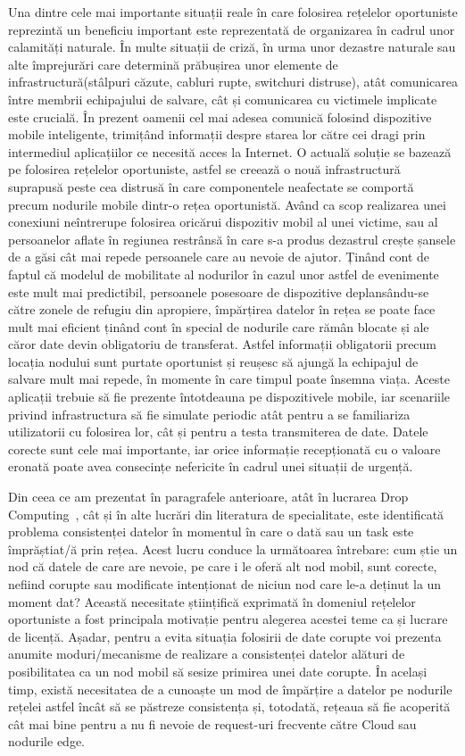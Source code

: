\documentclass[12pt,a4paper]{report}
\begin{document}
Una dintre cele mai importante situații reale în care folosirea rețelelor oportuniste reprezintă un beneficiu important este reprezentată de organizarea în cadrul unor calamități naturale. În multe situații de criză, în urma unor dezastre naturale sau alte împrejurări care determină prăbușirea unor elemente de infrastructură(stâlpuri căzute, cabluri rupte, switchuri distruse), atât comunicarea între membrii echipajului de salvare, cât și comunicarea cu victimele implicate este crucială. În prezent oamenii cel mai adesea comunică folosind dispozitive mobile inteligente, trimițând informații despre starea lor către cei dragi prin intermediul aplicațiilor ce necesită acces la Internet. O actuală soluție se bazează pe folosirea rețelelor oportuniste, astfel se creează o nouă infrastructură suprapusă peste cea distrusă în care componentele neafectate se comportă precum nodurile mobile dintr-o rețea oportunistă. Având ca scop realizarea unei conexiuni neîntrerupe folosirea oricărui dispozitiv mobil al unei victime, sau al persoanelor aflate în regiunea restrânsă în care s-a produs dezastrul crește șansele de a găsi cât mai repede persoanele care au nevoie de ajutor. Ținând cont de faptul că modelul de mobilitate al nodurilor în cazul unor astfel de evenimente este mult mai predictibil, persoanele posesoare de dispozitive deplansându-se către zonele de refugiu din apropiere, împărțirea datelor în rețea se poate face mult mai eficient ținând cont în special de nodurile care rămân blocate și ale căror date devin obligatoriu de transferat. Astfel informații obligatorii precum locația nodului sunt purtate oportunist și reușesc să ajungă la echipajul de salvare mult mai repede, în momente în care timpul poate însemna viața. Aceste aplicații trebuie să fie prezente întotdeauna pe dispozitivele mobile, iar scenariile privind infrastructura să fie simulate periodic atât pentru a se familiariza utilizatorii cu folosirea lor, cât și pentru a testa transmiterea de date. Datele corecte sunt cele mai importante, iar orice informație recepționată cu o valoare eronată poate avea consecințe nefericite în cadrul unei situații de urgență.

Din ceea ce am prezentat în paragrafele anterioare, atât în lucrarea Drop Computing~\cite{DC}, cât și în alte lucrări din literatura de specialitate, este identificată problema consistenței datelor în momentul în care o dată sau un task este împrăștiat/ă prin rețea. Acest lucru conduce la următoarea întrebare: cum știe un nod că datele de care are nevoie, pe care i le oferă alt nod mobil, sunt corecte, nefiind corupte sau modificate intenționat de niciun nod care le-a deținut la un moment dat? Această necesitate științifică exprimată în domeniul rețelelor oportuniste a fost principala motivație pentru alegerea acestei teme ca și lucrare de licență. Așadar, pentru a evita situația folosirii de date corupte voi prezenta anumite moduri/mecanisme de realizare a consistenței datelor alături de posibilitatea ca un nod mobil să sesize primirea unei date corupte. În același timp, există necesitatea de a cunoaște un mod de împărțire a datelor pe nodurile rețelei astfel încât să se păstreze consistența și, totodată, rețeaua să fie acoperită cât mai bine pentru a nu fi nevoie de request-uri frecvente către Cloud sau nodurile edge.
\end{document}
